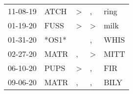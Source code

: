 \begin{supertabular}{p{0.07\textwidth}p{0.06\textwidth}p{0.02\textwidth}p{0.02\textwidth}p{0.06\textwidth}}
 11-08-19\textsuperscript{} &  ATCH\textsuperscript{} &  \textgreater &             , &           ring\textsuperscript{} \\
 01-19-20\textsuperscript{} &  FUSS\textsuperscript{} &  \textgreater &  \textgreater &           milk\textsuperscript{} \\
 01-31-20\textsuperscript{} &                   *OS1* &               &             , &           WHIS\textsuperscript{} \\
 02-27-20\textsuperscript{} &  MATR\textsuperscript{} &             , &  \textgreater &           MITT\textsuperscript{} \\
 06-10-20\textsuperscript{} &  PUPS\textsuperscript{} &  \textgreater &             , &            FIR\textsuperscript{} \\
 09-06-20\textsuperscript{} &  MATR\textsuperscript{} &             , &             , &           BILY\textsuperscript{} \\
\end{supertabular}
